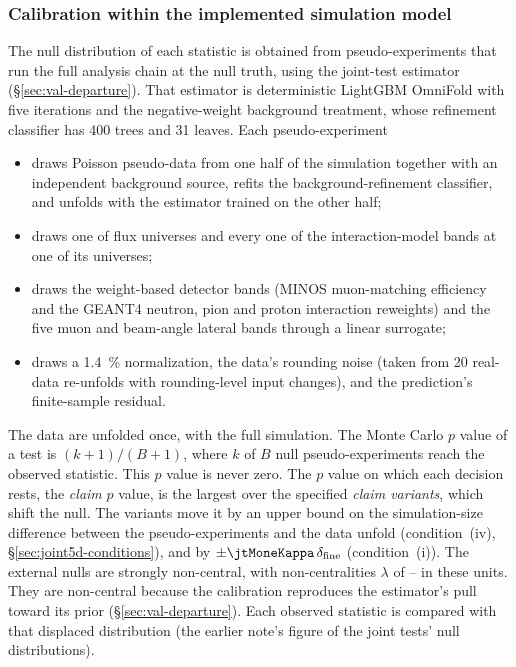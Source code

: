 \subsubsection{Calibration within the implemented simulation model}

The null distribution of each statistic is obtained from pseudo-experiments that run the full analysis chain at the null truth, using the joint-test estimator (\S\ref{sec:val-departure}). That estimator is deterministic LightGBM OmniFold with five iterations and the negative-weight background treatment, whose refinement classifier has 400 trees and 31 leaves. Each pseudo-experiment

\begin{itemize}[itemsep=1pt, topsep=2pt]
  \item draws Poisson pseudo-data from one half of the simulation together with an independent background source, refits the background-refinement classifier, and unfolds with the estimator trained on the other half;
  \item draws one of \jtFluxUniverses{} flux universes and every one of the \jtModelBands{} interaction-model bands at one of its universes;
  \item draws the weight-based detector bands (MINOS muon-matching efficiency and the GEANT4 neutron, pion and proton interaction reweights) and the five muon and beam-angle lateral bands through a linear surrogate;
  \item draws a \SI{1.4}{\percent} normalization, the data's rounding noise (taken from 20 real-data re-unfolds with rounding-level input changes), and the prediction's finite-sample residual.
\end{itemize}

The data are unfolded once, with the full simulation. The Monte Carlo $p$ value of a test is $(k+1)/(B+1)$, where $k$ of $B$ null pseudo-experiments reach the observed statistic. This $p$ value is never zero. The $p$ value on which each decision rests, the \emph{claim} $p$ value, is the largest over the specified \emph{claim variants}, which shift the null. The variants move it by an upper bound on the simulation-size difference between the pseudo-experiments and the data unfold (condition~(iv), \S\ref{sec:joint5d-conditions}), and by $\pm\jtMoneKappa\,\delta_{\mathrm{fine}}$ (condition~(i)). The external nulls are strongly non-central, with non-centralities $\lambda$ of \jtLambdaMin{}--\jtLambdaMax{} in these units. They are non-central because the calibration reproduces the estimator's pull toward its prior (\S\ref{sec:val-departure}). Each observed statistic is compared with that displaced distribution (the earlier note's figure of the joint tests' null distributions).

